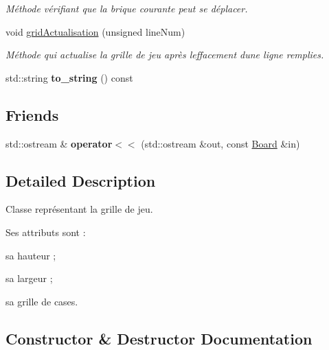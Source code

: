 \begin{DoxyCompactItemize}
\begin{DoxyCompactList}\small\item\em Méthode vérifiant que la brique courante peut se déplacer. \end{DoxyCompactList}\item 
void \hyperlink{class_g_j___g_w_1_1_board_adbde00b1988b78b70ab903c9a7049ca3}{grid\+Actualisation} (unsigned line\+Num)
\begin{DoxyCompactList}\small\item\em Méthode qui actualise la grille de jeu après l\textquotesingle{}effacement d\textquotesingle{}une ligne remplies. \end{DoxyCompactList}\item 
std\+::string {\bfseries to\+\_\+string} () const \hypertarget{class_g_j___g_w_1_1_board_aa0e6f82d217b36eb1c1c47c1923914da}{}\label{class_g_j___g_w_1_1_board_aa0e6f82d217b36eb1c1c47c1923914da}

\end{DoxyCompactItemize}
\subsection*{Friends}
\begin{DoxyCompactItemize}
\item 
std\+::ostream \& {\bfseries operator$<$$<$} (std\+::ostream \&out, const \hyperlink{class_g_j___g_w_1_1_board}{Board} \&in)\hypertarget{class_g_j___g_w_1_1_board_a43ea56eff2b5462c9ce89356c1a2a7c3}{}\label{class_g_j___g_w_1_1_board_a43ea56eff2b5462c9ce89356c1a2a7c3}

\end{DoxyCompactItemize}


\subsection{Detailed Description}
Classe représentant la grille de jeu. 

Ses attributs sont \+:


\begin{DoxyItemize}
\item sa hauteur ;
\item sa largeur ;
\item sa grille de cases. 
\end{DoxyItemize}

\subsection{Constructor \& Destructor Documentation}
